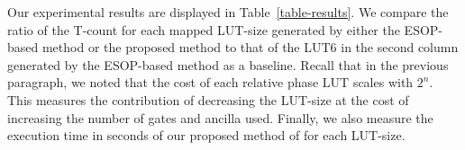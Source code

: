 Our experimental results are displayed in
Table~\ref{table-results}. We compare the ratio of the T-count for
each mapped LUT-size generated by either the ESOP-based method or the proposed 
method to that of the LUT6 in the second column generated by the
ESOP-based method as a baseline.  
Recall that in the previous paragraph, we noted that the cost of each relative
phase LUT scales with $2^n$. This measures the contribution of
decreasing the LUT-size at the cost of increasing the number of gates 
and ancilla used. Finally, we also measure the execution time in
seconds of our proposed method of for each LUT-size. 


